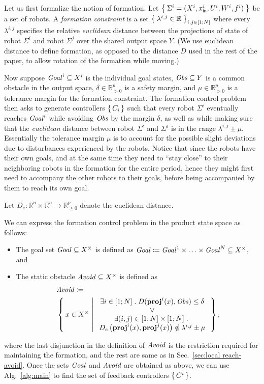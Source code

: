 Let us first formalize the notion of formation.
Let $\Set{\Sigma^i=(X^i,x_{\mathsf{in}}^i,U^i,W^i,f^i)}$ be a set of robots.
A \emph{formation constraint} is a set $\Set{\lambda^{i,j}\in \mathbb{R}}_{i,j\in [1;N]}$ where every $\lambda^{i,j}$ specifies the relative \emph{euclidean} distance between the projections of state of robot $\Sigma^i$ and robot $\Sigma^j$ over the shared output space $Y$.
(We use euclidean distance to define formation, as opposed to the distance $D$ used in the rest of the paper, to allow rotation of the formation while moving.)

Now suppose $\mathit{Goal}^i\subseteq X^i$ is the individual goal states, $\mathit{Obs}\subseteq Y$ is a common obstacle in the output space, $\delta \in \mathbb{R}^p_{>0}$ is a safety margin, and $\mu\in \mathbb{R}^p_{>0}$ is a tolerance margin for the formation constraint.
The formation control problem then asks to generate controllers $\set{C_i}$ such that every robot $\Sigma^i$ eventually reaches $\mathit{Goal}^i$ while avoiding $\mathit{Obs}$ by the margin $\delta$, as well as while making sure that the \emph{euclidean} distance between robot $\Sigma^i$ and $\Sigma^j$ is in the range $\lambda^{i,j} \pm \mu$.
Essentially the tolerance margin $\mu$ is to account for the possible slight deviations due to disturbances experienced by the robots. Notice that since the robots have their own goals, and at the same time they need to ``stay close'' to their neighboring robots in the formation for the entire period, hence they might first need to accompany the other robots to their goals, before being accompanied by them to reach its own goal.

Let $D_e\colon \mathbb{R}^n\times \mathbb{R}^n\to \mathbb{R}^p_{\geq0}$ denote the euclidean distance.

We can express the formation control problem in the product state space as follows:
\begin{itemize}
	\item The goal set $\mathit{Goal}\subseteq X^\times$ is defined as $\mathit{Goal} \coloneqq \mathit{Goal}^1\times \ldots \times \mathit{Goal}^N \subseteq X^\times$, and
	\item The static obstacle $\mathit{Avoid}\subseteq X^\times$ is defined as 
		\begin{align}
			&\mathit{Avoid} \coloneqq\nonumber\\ 
			&\Set{ x\in X^\times | 
				\begin{array}{c}
					\exists i\in [1;N]\;.\; D(\mathbf{proj}^i(x),\mathit{Obs}) \leq \delta\\
					\vee\\
					\exists (i,j)\in [1;N]\times [1;N]\;.\;\\ D_e\left(\mathbf{proj}^i(x),\mathbf{proj}^j(x)\right)\notin\lambda^{i,j}\pm \mu
			\end{array}},					
		\end{align}
\end{itemize}
where the last disjunction in the definition of $\mathit{Avoid}$ is the restriction required for maintaining the formation, and the rest are same as in Sec.~\ref{sec:local reach-avoid}.
Once the sets $\mathit{Goal}$ and $\mathit{Avoid}$ are obtained as above, we can use Alg.~\ref{alg:main} to find the set of feedback controllers $\set{C^i}$.

